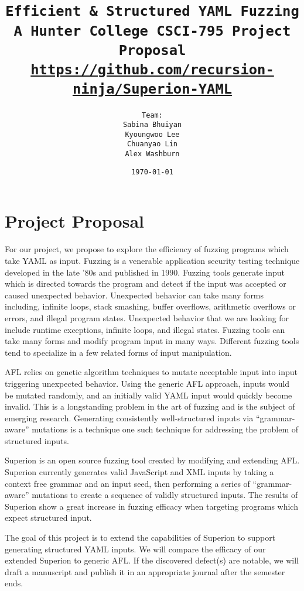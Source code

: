 \documentclass[12pt]{diazessay}
\title{\texttt{\huge{Efficient \& Structured YAML Fuzzing} \\\vspace{-0.65cm} {\large A Hunter College CSCI-795 Project Proposal}\\\normalsize\url{https://github.com/recursion-ninja/Superion-YAML}}} %
\author{\texttt{{\Huge Team:}\\\vspace*{-0.5em} 
		Sabina Bhuiyan \\\vspace*{-0.5em} 
		Kyoungwoo Lee \\\vspace*{-0.5em}
		Chuanyao Lin \\\vspace*{-0.25em}
		Alex Washburn}} %
\date{\texttt{\today}} %
\begin{document}
\maketitle %

\vspace{-2cm}
\section*{Project Proposal}

For our project, we propose to explore the efficiency of fuzzing programs which take YAML\cite{YAMLdraft} as input.
Fuzzing is a venerable application security testing technique developed in the late '80s\cite{Barton1988} and published in 1990\cite{Miller1990}.
Fuzzing tools generate input which is directed towards the program and detect if the input was accepted or caused unexpected behavior.
Unexpected behavior can take many forms including, infinite loops, stack smashing, buffer overflows, arithmetic overflows or errors, and illegal program states.
Unexpected behavior that we are looking for include runtime exceptions, infinite loops, and illegal states.
Fuzzing tools can take many forms\cite{ModelBasedFuzzing}\cite{GrammarBasedFuzzing}\cite{ProtocolBasedFuzzing} and modify program input in many ways.
Different fuzzing tools tend to specialize in a few related forms of input\cite{InputDiversity} manipulation.

AFL\cite{AFL_page} relies on genetic algorithm techniques\cite{InputMutationAlgorithm} to mutate acceptable input into input triggering unexpected behavior. Using the generic AFL approach, inputs would be mutated randomly, and an initially valid YAML input would quickly become invalid.
This is a longstanding problem in the art of fuzzing and is the subject of emerging research.
Generating consistently well-structured inputs\cite{structuredInput} via ``grammar-aware'' mutations is a technique one such technique for addressing the problem of structured inputs.

Superion\cite{superion} is an open source fuzzing tool created by modifying and extending AFL.
Superion currently generates valid JavaScript and XML inputs by taking a context free grammar and an input seed, then performing a series of ``grammar-aware'' mutations to create a sequence of validly structured inputs.
The results of Superion show a great increase in fuzzing efficacy when targeting programs which expect structured input. 

The goal of this project is to extend the capabilities of Superion to support generating structured YAML inputs.
We will compare the efficacy of our extended Superion to generic AFL.
If the discovered defect(s) are notable, we will draft a manuscript and publish it in an appropriate journal after the semester ends.
\end{document}
